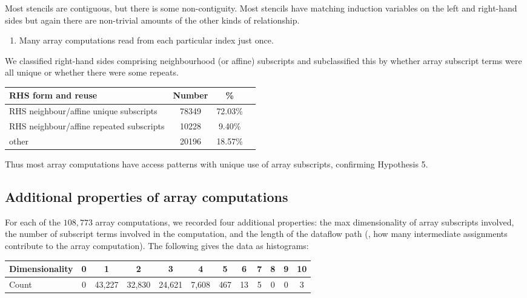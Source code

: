 Most stencils are contiguous, but there is some
non-contiguity. Most stencils have matching induction
variables on the left and right-hand sides but again there
are non-trivial amounts of the other kinds of relationship.
\begin{enumerate}[resume]
\item Many array computations read from each particular index just
  once.
\end{enumerate}
%
We classified right-hand sides comprising neighbourhood (or
affine) subscripts and subclassified this by whether array subscript terms were
all unique or whether there were some repeats.
%
\begin{center}
\begin{tabular}{l|S[table-format=4]S[table-format=2.2]S[table-format=4]}
\textbf{RHS form and reuse} & \textbf{Number} & \% \\ \hline
RHS neighbour/affine unique subscripts      & 78349     & 72.03\%  \\\hline
RHS neighbour/affine repeated subscripts   & 10228     & 9.40\%  \\\hline
other                             & 20196     & 18.57\%  %
\end{tabular}
\end{center}
%
Thus most array computations have access patterns with
unique use of array subscripts, confirming Hypothesis 5.

\subsection{Additional properties of array computations}
\label{subsec:additional-data}

\noindent
For each of the $108,773$ array computations, we recorded four
additional properties: the max dimensionality of array
subscripts involved, %
the number of subscript terms involved in the computation, and the
length of the dataflow path (\ie{}, how many intermediate assignments
contribute to the array computation). The following gives the data
as histograms:

\setlength{\tabcolsep}{0.25em}
\begin{center}
\begin{tabular}{l|ccccccccccc}
  \textbf{Dimensionality} & 0 & 1     & 2     & 3     & 4    & 5   & 6 & 7 & 8 & 9 & 10 \\\hline
  Count                   & 0 & 43,227 & 32,830 & 24,621 & 7,608 & 467 & 13 & 5 & 0 & 0 & 3
  \end{tabular}
\end{center}

